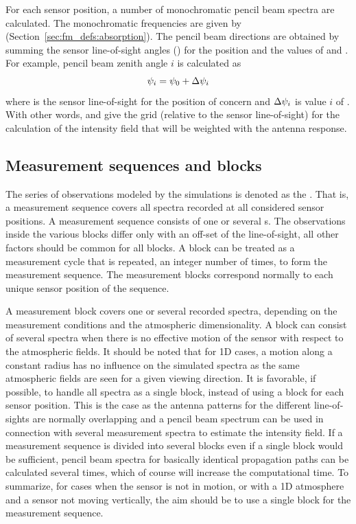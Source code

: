 For each sensor position, a number of monochromatic pencil beam
spectra are calculated. The monochromatic frequencies are given by
 (Section~\ref{sec:fm_defs:absorption}). The pencil
beam directions are obtained by summing the sensor line-of-sight
angles () for the position and the values of
 and . For
example, pencil beam zenith angle $i$ is calculated as
\begin{equation}
  \psi_{i} = \psi_{0} + \Delta\psi_{i}
  \label{eq:fm_defs:psi_grid}
\end{equation}
where  is the sensor line-of-sight for the position of
concern and $\Delta\psi_{i}$ is value $i$ of
.  With other words,
 and  give
the grid (relative to the sensor line-of-sight) for the calculation of
the intensity field that will be weighted with the antenna response.


\subsection{Measurement sequences and blocks}
\label{sec:fm_defs:seqsandblocks}

The series of observations modeled by the simulations is denoted as
the . That is, a measurement sequence
covers all spectra recorded at all considered sensor positions. A
measurement sequence consists of one or several s. The observations inside the various blocks differ only with
an off-set of the line-of-sight, all other factors should be common
for all blocks. A block can be treated as a measurement cycle that is
repeated, an integer number of times, to form the measurement
sequence.  The measurement blocks correspond normally to each unique
sensor position of the sequence.

A measurement block covers one or several recorded spectra, depending
on the measurement conditions and the atmospheric dimensionality. A
block can consist of several spectra when there is no effective motion
of the sensor with respect to the atmospheric fields. It should be
noted that for 1D cases, a motion along a constant radius has no
influence on the simulated spectra as the same atmospheric fields are
seen for a given viewing direction. It is favorable, if possible, to
handle all spectra as a single block, instead of using a block for
each sensor position. This is the case as the antenna patterns for the
different line-of-sights are normally overlapping and a pencil beam
spectrum can be used in connection with several measurement spectra to
estimate the intensity field. If a measurement sequence is divided
into several blocks even if a single block would be sufficient, pencil
beam spectra for basically identical propagation paths can be
calculated several times, which of course will increase the
computational time. To summarize, for cases when the sensor is not in
motion, or with a 1D atmosphere and a sensor not moving vertically,
the aim should be to use a single block for the measurement sequence.

